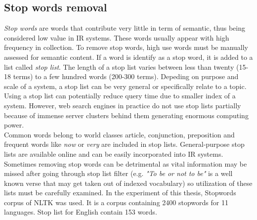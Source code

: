 \subsection*{Stop words removal}
\textit{Stop words} are words that contribute very little in term of semantic, thus being considered low value in IR systems. These words usually appear with high frequency in collection. To remove stop words, high use words must be manually assessed for semantic content. If a word is identify as a stop word, it is added to a list called \textit{stop list}. The length of a stop list varies between less than twenty (15-18 terms) to a few hundred words (200-300 terms). Depeding on purpose and scale of a system, a stop list can be very general or specifically relate to a topic.\\
Using a stop list can potentially reduce query time due to smaller index of a system. However, web search engines in practice do not use stop lists partially because of immense server clusters behind them generating enormous computing power. \\
Common words belong to world classes article, conjunction, preposition and frequent words like \textit{now} or \textit{very} are included in stop lists. General-purpose stop lists are available online and can be easily incorporated into IR systems. Sometimes removing stop words can be detrimental as vital information may be missed after going through stop list filter (e.g. \textit{"To be or not to be"} is a well known verse that may get taken out of indexed vocabulary) so utilization of these lists must be carefully examined. In the experiment of this thesis, Stopwords corpus of NLTK was used. It is a corpus containing 2400 stopwords for 11 languages. Stop list for English contain 153 words.\\

